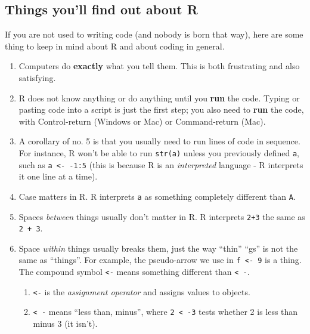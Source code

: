 \documentclass[
  letterpaper,
  DIV=11,
  numbers=noendperiod]{scrreprt}
\providecommand{\tightlist}{%
  \setlength{\itemsep}{0pt}\setlength{\parskip}{0pt}}
\begin{document}
\subsection{Things you'll find out about
R}\label{things-youll-find-out-about-r}

If you are not used to writing code (and nobody is born that way), here
are some thing to keep in mind about R and about coding in general.

\begin{enumerate}
\def\labelenumi{\arabic{enumi}.}
\tightlist
\item
  Computers do \textbf{exactly} what you tell them. This is both
  frustrating and also satisfying.
\item
  R does not know anything or do anything until you \textbf{run} the
  code. Typing or pasting code into a script is just the first step; you
  also need to \textbf{run} the code, with Control-return (Windows or
  Mac) or Command-return (Mac).
\item
  A corollary of no. 5 is that you usually need to run lines of code in
  sequence. For instance, R won't be able to run \texttt{str(a)} unless
  you previously defined \texttt{a}, such as
  \texttt{a\ \textless{}-\ -1:5} (this is because R is an
  \emph{interpreted} language - R interprets it one line at a time).
\item
  Case matters in R. R interprets \texttt{a} as something completely
  different than \texttt{A}.
\item
  Spaces \emph{between} things usually don't matter in R. R interprets
  \texttt{2+3} the same as \texttt{2\ +\ 3}.
\item
  Space \emph{within} things usually breaks them, just the way ``thin''
  ``gs'' is not the same as ``things''. For example, the pseudo-arrow we
  use in \texttt{f\ \textless{}-\ 9} is a thing. The compound symbol
  \texttt{\textless{}-} means something different than
  \texttt{\textless{}\ -}.

  \begin{enumerate}
  \def\labelenumii{\roman{enumii}.}
  \tightlist
  \item
    \texttt{\textless{}-} is the \emph{assignment operator} and assigns
    values to objects.
  \item
    \texttt{\textless{}\ -} means ``less than, minus'', where
    \texttt{2\ \textless{}\ -3} tests whether 2 is less than minus 3 (it
    isn't).
  \end{enumerate}
\end{enumerate}
\end{document}
